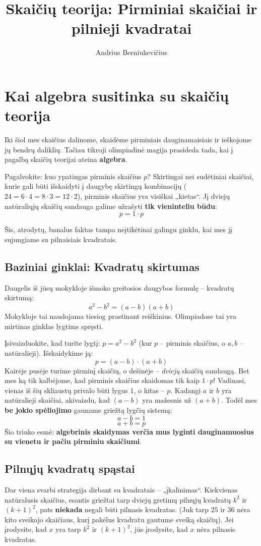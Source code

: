 \documentclass[11pt,a4paper]{scrartcl}
\title{Skaičių teorija: Pirminiai skaičiai ir pilnieji kvadratai}
\author{Andrius Berniukevičius}
\begin{document}
\maketitle

\section{Kai algebra susitinka su skaičių teorija}

Iki šiol mes skaičius dalinome, skaidėme pirminiais dauginamaisiais ir ieškojome jų bendrų daliklių. Tačiau tikroji olimpiadinė magija prasideda tada, kai į pagalbą skaičių teorijai ateina \textbf{algebra}. 

Pagalvokite: kuo ypatingas pirminis skaičius $p$? Skirtingai nei sudėtiniai skaičiai, kurie gali būti išskaidyti į daugybę skirtingų kombinacijų ($24 = 6 \cdot 4 = 8 \cdot 3 = 12 \cdot 2$), pirminis skaičius yra visiškai „kietas“. Jį dviejų natūraliųjų skaičių sandauga galime užrašyti \textbf{tik vieninteliu būdu}:
$$ p = 1 \cdot p $$

Šis, atrodytų, banalus faktas tampa neįtikėtinai galingu ginklu, kai mes jį sujungiame su pilnaisiais kvadratais.

\subsection{Baziniai ginklai: Kvadratų skirtumas}

Daugelis iš jūsų mokykloje išmoko greitosios daugybos formulę – kvadratų skirtumą:
$$ a^2 - b^2 = (a - b)(a + b) $$
Mokykloje tai naudojama tiesiog prastinant reiškinius. Olimpiadose tai yra mirtinas ginklas lygtims spręsti. 

Įsivaizduokite, kad turite lygtį: $p = a^2 - b^2$ (kur $p$ – pirminis skaičius, o $a, b$ – natūralieji).
Išskaidykime ją:
$$ p = (a - b) \cdot (a + b) $$
Kairėje pusėje turime pirminį skaičių, o dešinėje – \textit{dviejų} skaičių sandaugą. Bet mes ką tik kalbėjome, kad pirminis skaičius skaidomas tik kaip $1 \cdot p$! Vadinasi, vienas iš šių skliaustų privalo būti lygus $1$, o kitas – $p$. Kadangi $a$ ir $b$ yra natūralieji skaičiai, akivaizdu, kad $(a-b)$ yra mažesnis už $(a+b)$. Todėl mes \textbf{be jokio spėliojimo} gauname griežtą lygčių sistemą:
$$ a - b = 1 $$
$$ a + b = p $$
Šio triuko esmė: \textbf{algebrinis skaidymas verčia mus lyginti dauginamuosius su vienetu ir pačiu pirminiu skaičiumi}.

\subsection{Pilnųjų kvadratų spąstai}
Dar viena svarbi strategija dirbant su kvadratais – „įkalinimas“. Kiekvienas natūralusis skaičius, esantis griežtai tarp dviejų gretimų pilnųjų kvadratų $k^2$ ir $(k+1)^2$, pats \textbf{niekada} negali būti pilnasis kvadratas. (Juk tarp $25$ ir $36$ nėra kito sveikojo skaičiaus, kurį pakėlus kvadratu gautume sveiką skaičių). Jei įrodysite, kad $x$ yra tarp $k^2$ ir $(k+1)^2$, jūs įrodysite, kad $x$ nėra pilnasis kvadratas.
\end{document}
